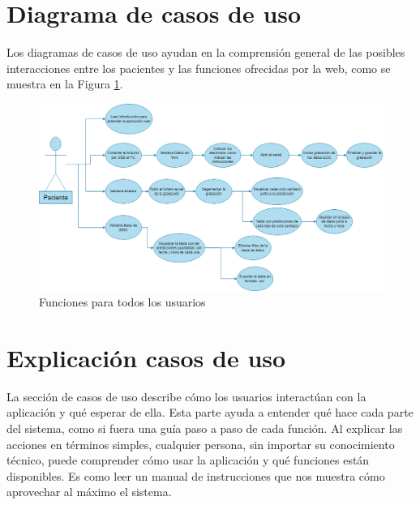 \section{Diagrama de casos de uso}
Los diagramas de casos de uso ayudan en la comprensión general de las posibles interacciones entre los pacientes y las funciones ofrecidas por la web, como se muestra en la Figura \ref{fig:diagrama}.

\begin{figure}[h]
\centering
\includegraphics[width=1\textwidth]{img/Diagramas/casosdeuso.drawio (1).png}
\caption{Funciones para todos los usuarios}
\label{fig:diagrama}
\end{figure}

\section{Explicación casos de uso}


La sección de casos de uso describe cómo los usuarios interactúan con la aplicación y qué esperar de ella. Esta parte ayuda a entender qué hace cada parte del sistema, como si fuera una guía paso a paso de cada función. Al explicar las acciones en términos simples, cualquier persona, sin importar su conocimiento técnico, puede comprender cómo usar la aplicación y qué funciones están disponibles. Es como leer un manual de instrucciones que nos muestra cómo aprovechar al máximo el sistema.




